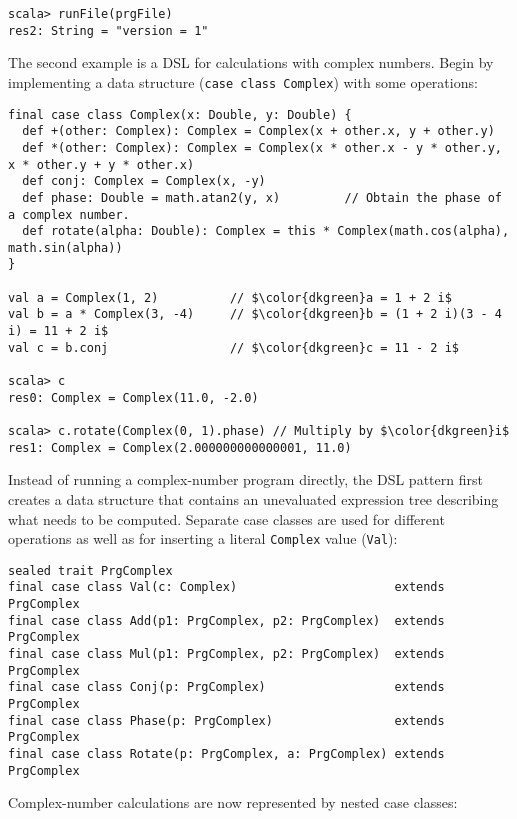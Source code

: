 \begin{lstlisting}
scala> runFile(prgFile)
res2: String = "version = 1"
\end{lstlisting}
The second example is a DSL for calculations with complex numbers.
Begin by implementing a data structure (\lstinline!case class Complex!)
with some operations: 
\begin{lstlisting}[mathescape=true]
final case class Complex(x: Double, y: Double) {
  def +(other: Complex): Complex = Complex(x + other.x, y + other.y)
  def *(other: Complex): Complex = Complex(x * other.x - y * other.y, x * other.y + y * other.x)
  def conj: Complex = Complex(x, -y)
  def phase: Double = math.atan2(y, x)         // Obtain the phase of a complex number.
  def rotate(alpha: Double): Complex = this * Complex(math.cos(alpha), math.sin(alpha))
}

val a = Complex(1, 2)          // $\color{dkgreen}a = 1 + 2 i$
val b = a * Complex(3, -4)     // $\color{dkgreen}b = (1 + 2 i)(3 - 4 i) = 11 + 2 i$
val c = b.conj                 // $\color{dkgreen}c = 11 - 2 i$

scala> c
res0: Complex = Complex(11.0, -2.0)

scala> c.rotate(Complex(0, 1).phase) // Multiply by $\color{dkgreen}i$
res1: Complex = Complex(2.000000000000001, 11.0)
\end{lstlisting}
Instead of running a complex-number program directly, the DSL pattern
first creates a data structure that contains an unevaluated expression
tree describing what needs to be computed. Separate case classes are
used for different operations as well as for inserting a literal \lstinline!Complex!
value (\lstinline!Val!):
\begin{lstlisting}
sealed trait PrgComplex
final case class Val(c: Complex)                      extends PrgComplex
final case class Add(p1: PrgComplex, p2: PrgComplex)  extends PrgComplex
final case class Mul(p1: PrgComplex, p2: PrgComplex)  extends PrgComplex
final case class Conj(p: PrgComplex)                  extends PrgComplex
final case class Phase(p: PrgComplex)                 extends PrgComplex
final case class Rotate(p: PrgComplex, a: PrgComplex) extends PrgComplex
\end{lstlisting}
Complex-number calculations are now represented by nested case classes:
